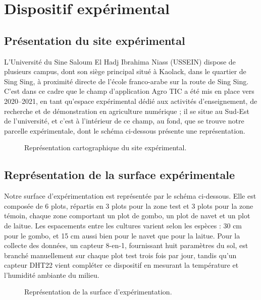 \section{Dispositif expérimental}

\subsection{Présentation du site expérimental}
L'Université du Sine Saloum El Hadj Ibrahima Niass (USSEIN)  dispose de plusieurs campus, dont son siège principal situé à Kaolack, dans le quartier de Sing Sing, à proximité directe de l'école franco-arabe sur la route de Sing Sing. C'est dans ce cadre que le champ d'application Agro TIC a été mis en place vers 2020--2021, en tant qu'espace expérimental dédié aux activités d'enseignement, de recherche et de démonstration en agriculture numérique ; il se situe au Sud-Est de l'université, et c'est à l'intérieur de ce champ, au fond, que se trouve notre parcelle expérimentale, dont le schéma ci-dessous présente une représentation. 
\begin{figure}[H]
    \centering
    \caption{Représentation cartographique du site expérimental. }
    \label{fig:site2}
\end{figure}

\subsection{Représentation de la surface expérimentale}

Notre surface d'expérimentation est représentée par le schéma ci-dessous. Elle est composée de 6 plots, répartis en 3 plots pour la zone test et 3 plots pour la zone témoin, chaque zone comportant un plot de gombo, un plot de navet et un plot de laitue. Les espacements entre les cultures varient selon les espèces : 30 cm pour le gombo, et 15 cm aussi bien pour le navet que pour la laitue. Pour la collecte des données, un capteur 8-en-1, fournissant huit paramètres du sol, est branché manuellement sur chaque plot test trois fois par jour, tandis qu'un capteur DHT22 vient compléter ce dispositif en mesurant la température et l'humidité ambiante du milieu.
\begin{figure}[H]
    \centering
    \caption{Représentation de la surface d'expérimentation. }
    \label{fig:surface2}
\end{figure}

